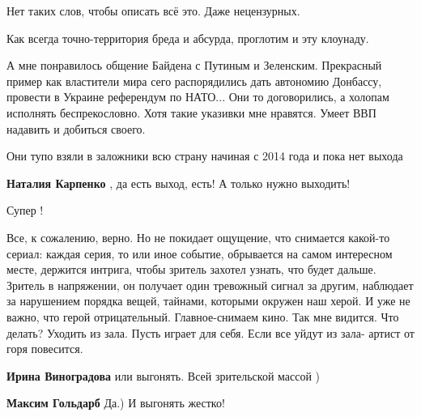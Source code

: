  
 
 
 
 
\zzSecCmt

\begin{itemize} %
Нет таких слов, чтобы описать всё это. Даже нецензурных.

Как всегда точно-территория бреда и абсурда, проглотим и эту клоунаду.


А мне понравилось общение Байдена с Путиным и Зеленским. Прекрасный пример как
властители мира сего распорядились дать автономию Донбассу, провести в Украине
референдум по НАТО... Они то договорились, а холопам исполнять беспрекословно.
Хотя такие указивки мне нравятся. Умеет ВВП надавить и добиться своего.


Они тупо взяли в заложники всю страну начиная с 2014 года и пока нет выхода

\begin{itemize} %
\textbf{Наталия Карпенко} , да есть выход, есть! А только нужно выходить!
\end{itemize} %

Супер !


Все, к сожалению, верно. Но не покидает ощущение, что снимается какой-то
сериал: каждая серия, то или иное событие, обрывается на самом интересном
месте, держится интрига, чтобы зритель захотел узнать, что будет дальше.
Зритель в напряжении, он получает один тревожный сигнал за другим, наблюдает за
нарушением порядка вещей, тайнами, которыми окружен наш херой. И уже не важно,
что герой отрицательный. Главное-снимаем кино. Так мне видится. Что делать?
Уходить из зала. Пусть играет для себя. Если все уйдут из зала- артист от горя
повесится.

\begin{itemize} %
\textbf{Ирина Виноградова} или выгонять. Всей зрительской массой )

\textbf{Максим Гольдарб} Да.) И выгонять жестко!
\end{itemize} %


\end{itemize}
